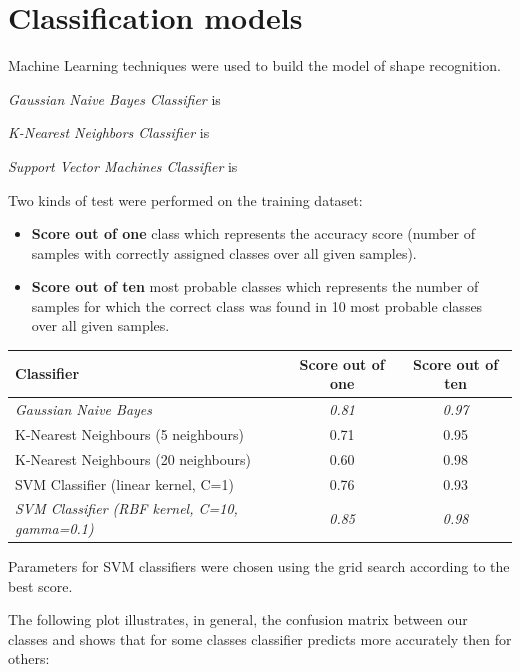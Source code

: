 \documentclass[12pt]{article}
\begin{document}
\section{Classification models}

Machine Learning techniques were used to build the model of shape recognition.  

\textit{Gaussian Naive Bayes Classifier} is

\textit{K-Nearest Neighbors Classifier} is

\textit{Support Vector Machines Classifier} is

Two kinds of test were performed on the training dataset:
\begin{itemize}
	\item \textbf{Score out of one} class which represents the accuracy score (number of samples with correctly assigned classes over all given samples).
	\item \textbf{Score out of ten} most probable classes which represents the number of samples for which the correct class was found in 10 most probable classes over all given samples.
\end{itemize}

\begin{center}
  \begin{tabular}{| l | c | c |}
    \hline
    \textbf{Classifier} & \textbf{Score out of one} & \textbf{Score out of ten}\\ \hline \hline
    \textit{Gaussian Naive Bayes} & \textit{0.81} & \textit{0.97} \\ \hline
	K-Nearest Neighbours (5 neighbours) & 0.71 & 0.95\\ \hline
	K-Nearest Neighbours (20 neighbours) & 0.60 & 0.98 \\ \hline
	SVM Classifier (linear kernel, C=1) & 0.76 & 0.93 \\ \hline
	\textit{SVM Classifier (RBF kernel, C=10, gamma=0.1)} & \textit{0.85} & \textit{0.98} \\ 
	\hline
  \end{tabular}
\end{center}

Parameters for SVM classifiers were chosen using the grid search according to the best score.

The following plot illustrates, in general, the confusion matrix between our classes and shows that for some classes classifier predicts more accurately then for others:
\end{document}
